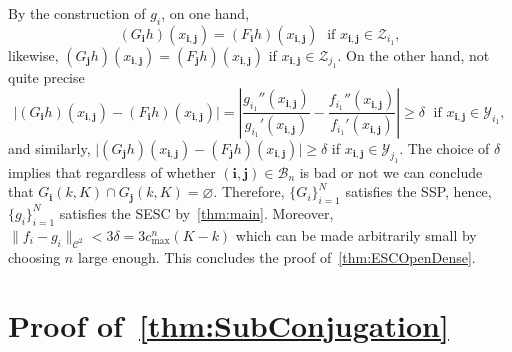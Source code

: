 \documentclass[12pt,]{article}
\theoremstyle{definition}
\theoremstyle{remark}
\newcommand{\0}{\mathbf{0}}
\newcommand{\bi}{\mathbf{i}}
\newcommand{\bj}{\mathbf{j}}
\begin{document}
{By the construction of $g_i$, on one hand,
\begin{equation*}
(G_{\bi}h)(x_{\bi,\bj})=(F_{\bi}h)(x_{\bi,\bj}) \; \text{ if } x_{\bi,\bj}\in\mathcal{Z}_{i_1}, 
\end{equation*}
likewise, $(G_{\bj}h)(x_{\bi,\bj})=(F_{\bj}h)(x_{\bi,\bj})$ if $x_{\bi,\bj}\in\mathcal{Z}_{j_1}$. On the other hand, {\color{red}not quite precise}
\begin{equation*}
\big|(G_{\bi}h)(x_{\bi,\bj})-(F_{\bi}h)(x_{\bi,\bj})\big| = \left| \frac{g_{i_1}''(x_{\bi,\bj})}{g_{i_1}'(x_{\bi,\bj})} - \frac{f_{i_1}''(x_{\bi,\bj})}{f_{i_1}'(x_{\bi,\bj})} \right|\geq \delta \; \text{ if } x_{\bi,\bj}\in\mathcal{Y}_{i_1},
\end{equation*}
and similarly, $\big|(G_{\bj}h)(x_{\bi,\bj})-(F_{\bj}h)(x_{\bi,\bj})\big|\geq \delta$ if $x_{\bi,\bj}\in\mathcal{Y}_{j_1}$. The choice of $\delta$ implies that regardless of whether $(\bi,\bj)\in\mathcal{B}_n$ is bad or not we can conclude that $G_{\bi}(k,K)\cap G_{\bj}(k,K)=\varnothing$. Therefore, $\{G_i\}_{i=1}^N$ satisfies the SSP, hence, $\{g_i\}_{i=1}^N$ satisfies the SESC by~\cref{thm:main}. Moreover, $\|f_i-g_i\|_{\mathcal{C}^2}<3\delta=3c_{\max}^n(K-k)$ which can be made arbitrarily small by choosing $n$ large enough. This concludes the proof of~\cref{thm:ESCOpenDense}.   

\section{Proof of~\cref{thm:SubConjugation}}\label{sec:ProofConjugation}

}
\end{document}
